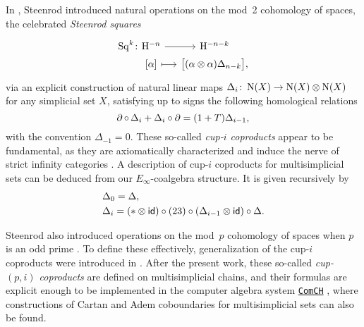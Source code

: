 In \cite{steenrod1947products}, Steenrod introduced natural operations on the mod~2 cohomology of spaces, the celebrated \textit{Steenrod squares}
\[
\begin{tikzcd} [column sep=small, row sep=0]
	\Sq^k \colon &[-20] \rH^{-n} \arrow[r] & \rH^{-n-k} \\ &
	{[\alpha]} \arrow[r, mapsto] & \big[ (\alpha \ot \alpha) \Delta_{n-k} \big],
\end{tikzcd}
\]
via an explicit construction of natural linear maps $\Delta_i \colon \operatorname{N}(X) \to \operatorname{N}(X) \otimes \operatorname{N}(X)$ for any simplicial set $X$, satisfying up to signs the following homological relations
\[
\operatorname{\partial} \circ \, \Delta_i + \Delta_i \circ \operatorname{\partial} = (1 + T) \Delta_{i-1},
\]
with the convention $\Delta_{-1} = 0$.
These so-called \textit{cup-$i$ coproducts} appear to be fundamental, as they are axiomatically characterized \cite{medina2022axiomatic} and induce the nerve of strict infinity categories \cite{medina2020globular}.
A description of cup-$i$ coproducts for multisimplicial sets can be deduced from our $E_\infty$-coalgebra structure.
It is given recursively by
\[
\begin{split}
	& \Delta_0 = \Delta, \\
	& \Delta_i =
	(\ast \otimes \mathsf{id}) \circ (23) \circ (\Delta_{i-1} \otimes \mathsf{id}) \circ \Delta.
\end{split}
\]

Steenrod also introduced operations on the mod~$p$ cohomology of spaces when $p$ is an odd prime \cite{steenrod1952reduced, steenrod1953cyclic}.
To define these effectively, generalization of the cup-$i$ coproducts were introduced in \cite{medina2021may_st}.
After the present work, these so-called \textit{cup-$(p,i)$ coproducts} are defined on multisimplicial chains, and their formulas are explicit enough to be implemented in the computer algebra system \href{https://comch.readthedocs.io/en/latest/}{\texttt{ComCH}} \cite{medina2021comch}, where constructions of Cartan and Adem coboundaries \cite{medina2020cartan,medina2021adem,medina2023oddcartan} for multisimplicial sets can also be found.